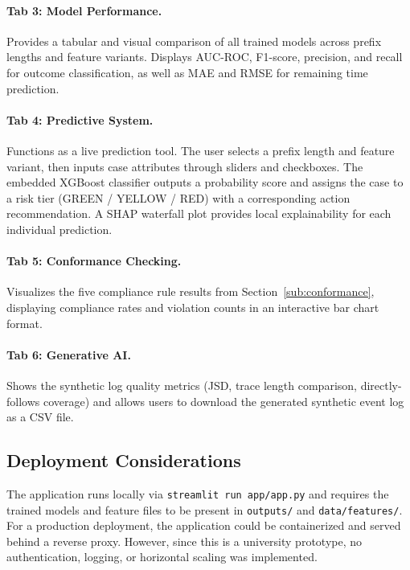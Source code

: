 \paragraph{Tab 3: Model Performance.}
Provides a tabular and visual comparison of all trained models across prefix lengths and feature variants. Displays AUC-ROC, F1-score, precision, and recall for outcome classification, as well as MAE and RMSE for remaining time prediction.

\paragraph{Tab 4: Predictive System.}
Functions as a live prediction tool. The user selects a prefix length and feature variant, then inputs case attributes through sliders and checkboxes. The embedded XGBoost classifier outputs a probability score and assigns the case to a risk tier (GREEN / YELLOW / RED) with a corresponding action recommendation. A SHAP waterfall plot provides local explainability for each individual prediction.

\paragraph{Tab 5: Conformance Checking.}
Visualizes the five compliance rule results from Section~\ref{sub:conformance}, displaying compliance rates and violation counts in an interactive bar chart format.

\paragraph{Tab 6: Generative AI.}
Shows the synthetic log quality metrics (JSD, trace length comparison, directly-follows coverage) and allows users to download the generated synthetic event log as a CSV file.

\subsection{Deployment Considerations}
\label{sub:deployment_notes}

The application runs locally via \texttt{streamlit run app/app.py} and requires the trained models and feature files to be present in \texttt{outputs/} and \texttt{data/features/}. For a production deployment, the application could be containerized and served behind a reverse proxy. However, since this is a university prototype, no authentication, logging, or horizontal scaling was implemented.
